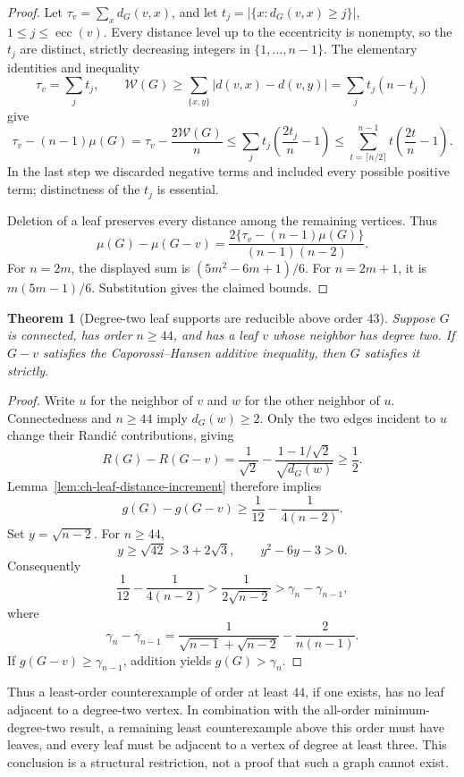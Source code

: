\documentclass[11pt,a4paper]{article}
\newtheorem{theorem}{Theorem}[section]
\theoremstyle{remark}
\numberwithin{equation}{section}
\begin{document}
\begin{proof}
Let \(\tau_v=\sum_xd_G(v,x)\), and let
\(t_j=|\{x:d_G(v,x)\ge j\}|\), \(1\le j\le\operatorname{ecc}(v)\).
Every distance level up to the eccentricity is nonempty, so the \(t_j\)
are distinct, strictly decreasing integers in \(\{1,\ldots,n-1\}\).
The elementary identities and inequality
\[
 \tau_v=\sum_jt_j,\qquad
 \mathcal W(G)\ge
 \sum_{\{x,y\}}|d(v,x)-d(v,y)|
 =\sum_j t_j(n-t_j)
\]
give
\[
 \tau_v-(n-1)\mu(G)
 =\tau_v-\frac{2\mathcal W(G)}n
 \le\sum_jt_j\left(\frac{2t_j}n-1\right)
 \le\sum_{t=\lceil n/2\rceil}^{n-1}
             t\left(\frac{2t}n-1\right).
\]
In the last step we discarded negative terms and included every possible
positive term; distinctness of the \(t_j\) is essential.

Deletion of a leaf preserves every distance among the remaining
vertices. Thus
\[
 \mu(G)-\mu(G-v)
 =\frac{2\{\tau_v-(n-1)\mu(G)\}}{(n-1)(n-2)}.
\]
For \(n=2m\), the displayed sum is
\((5m^2-6m+1)/6\). For \(n=2m+1\), it is
\(m(5m-1)/6\). Substitution gives the claimed bounds.
\end{proof}

\begin{theorem}[Degree-two leaf supports are reducible above order 43]
\label{thm:ch-leaf-support-two}
Suppose \(G\) is connected, has order \(n\ge44\), and has a leaf \(v\)
whose neighbor has degree two. If \(G-v\) satisfies the Caporossi--Hansen
additive inequality, then \(G\) satisfies it strictly.
\end{theorem}

\begin{proof}
Write \(u\) for the neighbor of \(v\) and \(w\) for the other neighbor of
\(u\). Connectedness and \(n\ge44\) imply \(d_G(w)\ge2\). Only the two
edges incident to \(u\) change their Randi\'c contributions, giving
\[
 R(G)-R(G-v)
 =\frac1{\sqrt2}
  -\frac{1-1/\sqrt2}{\sqrt{d_G(w)}}\ge\frac12.
\]
Lemma~\ref{lem:ch-leaf-distance-increment} therefore implies
\[
 g(G)-g(G-v)
 \ge\frac1{12}-\frac1{4(n-2)}.
\]
Set \(y=\sqrt{n-2}\). For \(n\ge44\),
\[
 y\ge\sqrt{42}>3+2\sqrt3,
 \qquad y^2-6y-3>0.
\]
Consequently
\[
 \frac1{12}-\frac1{4(n-2)}
 >\frac1{2\sqrt{n-2}}
 >\gamma_n-\gamma_{n-1},
\]
where
\[
 \gamma_n-\gamma_{n-1}
 =\frac1{\sqrt{n-1}+\sqrt{n-2}}
  -\frac2{n(n-1)}.
\]
If \(g(G-v)\ge\gamma_{n-1}\), addition yields \(g(G)>\gamma_n\).
\end{proof}

Thus a least-order counterexample of order at least \(44\), if one
exists, has no leaf adjacent to a degree-two vertex. In combination with
the all-order minimum-degree-two result, a remaining least counterexample
above this order must have leaves, and every leaf must be adjacent to a
vertex of degree at least three. This conclusion is a structural
restriction, not a proof that such a graph cannot exist.
\end{document}
